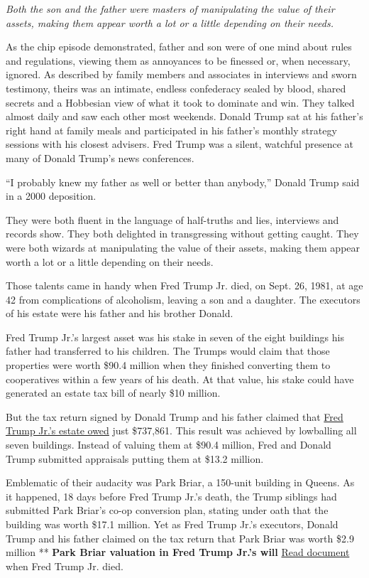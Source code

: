 \emph{Both the son and the father were masters of manipulating the value
of their assets, making them appear worth a lot or a little depending on
their needs.}

As the chip episode demonstrated, father and son were of one mind about
rules and regulations, viewing them as annoyances to be finessed or,
when necessary, ignored. As described by family members and associates
in interviews and sworn testimony, theirs was an intimate, endless
confederacy sealed by blood, shared secrets and a Hobbesian view of what
it took to dominate and win. They talked almost daily and saw each other
most weekends. Donald Trump sat at his father's right hand at family
meals and participated in his father's monthly strategy sessions with
his closest advisers. Fred Trump was a silent, watchful presence at many
of Donald Trump's news conferences.

``I probably knew my father as well or better than anybody,'' Donald
Trump said in a 2000 deposition.

They were both fluent in the language of half-truths and lies,
interviews and records show. They both delighted in transgressing
without getting caught. They were both wizards at manipulating the value
of their assets, making them appear worth a lot or a little depending on
their needs.

Those talents came in handy when Fred Trump Jr. died, on Sept. 26, 1981,
at age 42 from complications of alcoholism, leaving a son and a
daughter. The executors of his estate were his father and his brother
Donald.

Fred Trump Jr.'s largest asset was his stake in seven of the eight
buildings his father had transferred to his children. The Trumps would
claim that those properties were worth \$90.4 million when they finished
converting them to cooperatives within a few years of his death. At that
value, his stake could have generated an estate tax bill of nearly \$10
million.

But the tax return signed by Donald Trump and his father claimed that
\href{https://int.nyt.com/data/documenthelper/339-fred-jr-1981-estate-tax-return/2ed81084d70858cfbb17/optimized/full.pdf\#page=1}{Fred
Trump Jr.'s estate owed} just \$737,861. This result was achieved by
lowballing all seven buildings. Instead of valuing them at \$90.4
million, Fred and Donald Trump submitted appraisals putting them at
\$13.2 million.

Emblematic of their audacity was Park Briar, a 150-unit building in
Queens. As it happened, 18 days before Fred Trump Jr.'s death, the Trump
siblings had submitted Park Briar's co-op conversion plan, stating under
oath that the building was worth \$17.1 million. Yet as Fred Trump Jr.'s
executors, Donald Trump and his father claimed on the tax return that
Park Briar was worth \$2.9 million ** \textbf{Park Briar valuation in
Fred Trump Jr.'s will}
\href{https://int.nyt.com/data/documenthelper/200-park-briar-valuation-in-ft-jr-/255d1af7ef20e62c9b59/optimized/full.pdf\#page=1}{Read
document} when Fred Trump Jr. died.


